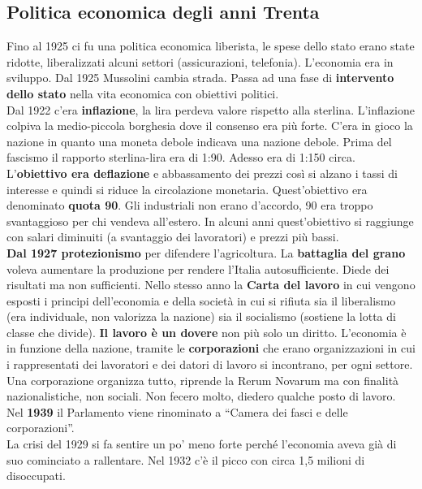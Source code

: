 \subsection{Politica economica degli anni Trenta}
Fino al 1925 ci fu una politica economica liberista, le spese dello stato erano state ridotte, 
liberalizzati alcuni settori (assicurazioni, telefonia). L'economia era in sviluppo. Dal 1925 
Mussolini cambia strada. Passa ad una fase di \textbf{intervento dello stato} nella vita economica
con obiettivi politici.\\
Dal 1922 c'era \textbf{inflazione}, la lira perdeva valore rispetto alla sterlina. L'inflazione 
colpiva la medio-piccola borghesia dove il consenso era più forte. C'era in gioco la nazione in 
quanto una moneta debole indicava una nazione debole. Prima del fascismo il rapporto sterlina-lira
era di 1:90. Adesso era di 1:150 circa. L'\textbf{obiettivo era deflazione} e abbassamento dei prezzi
così si alzano i tassi di interesse e quindi si riduce la circolazione monetaria. Quest'obiettivo era
denominato \textbf{quota 90}. Gli industriali non erano d'accordo, 90 era troppo svantaggioso per chi
vendeva all'estero. In alcuni anni quest'obiettivo si raggiunge con salari diminuiti (a svantaggio 
dei lavoratori) e prezzi più bassi.\\
\textbf{Dal 1927 protezionismo} per difendere l'agricoltura. La \textbf{battaglia del grano} voleva
aumentare la produzione per rendere l'Italia autosufficiente. Diede dei risultati ma non sufficienti.
Nello stesso anno la  \textbf{Carta del lavoro} in cui vengono esposti i principi dell'economia e
della società in cui si rifiuta sia il liberalismo (era individuale, non valorizza la nazione) sia
il socialismo (sostiene la lotta di classe che divide). \textbf{Il lavoro è un dovere} non più solo
un diritto. L'economia è in funzione della nazione, tramite le \textbf{corporazioni} che erano
organizzazioni in cui i rappresentati dei lavoratori e dei datori di lavoro si incontrano, per ogni
settore. Una corporazione organizza tutto, riprende la Rerum Novarum ma con finalità nazionalistiche,
non sociali. Non fecero molto, diedero qualche posto di lavoro.\\
Nel \textbf{1939} il Parlamento viene rinominato a ``Camera dei fasci e delle corporazioni''. \\
La crisi del 1929 si fa sentire un po' meno forte perché l'economia aveva già di suo cominciato a 
rallentare. Nel 1932 c'è il picco con circa 1,5 milioni di disoccupati.
